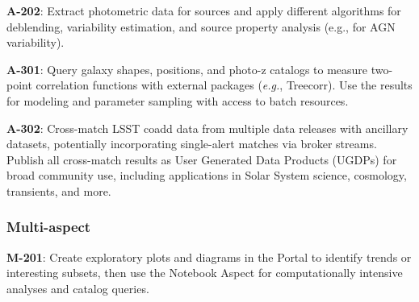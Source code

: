 \textbf{A-202}: Extract photometric data for sources and apply different algorithms for deblending, variability estimation, and source property analysis (e.g., for AGN variability). 

\textbf{A-301}: Query galaxy shapes, positions, and photo-z catalogs to measure two-point correlation functions with external packages (\emph{e.g.}, Treecorr).
Use the results for modeling and parameter sampling with access to batch resources.

\textbf{A-302}: Cross-match LSST coadd data from multiple data releases with ancillary datasets, potentially incorporating single-alert matches via broker streams.
Publish all cross-match results as User Generated Data Products (UGDPs) for broad community use, including applications in Solar System science, cosmology, transients, and more.

\subsubsection{Multi-aspect}

\textbf{M-201}: Create exploratory plots and diagrams in the Portal to identify trends or interesting subsets, then use the Notebook Aspect for computationally intensive analyses and catalog queries.
